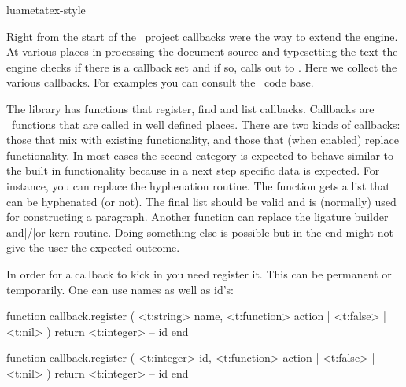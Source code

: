 

\environment luametatex-style

\startdocument[title=Callbacks]

\startsubject[title=Contents]
    \setups[sectioncontents]
\stopsubject

\startsection[title={Introduction}]

Right from the start of the \LUATEX\ project callbacks were the way to extend the
engine. At various places in processing the document source and typesetting the
text the engine checks if there is a callback set and if so, calls out to \LUA.
Here we collect the various callbacks. For examples you can consult the \CONTEXT\
code base.

The  library has functions that register, find and list
callbacks. Callbacks are \LUA\ functions that are called in well defined places.
There are two kinds of callbacks: those that mix with existing functionality, and
those that (when enabled) replace functionality. In most cases the second
category is expected to behave similar to the built in functionality because in a
next step specific data is expected. For instance, you can replace the
hyphenation routine. The function gets a list that can be hyphenated (or not).
The final list should be valid and is (normally) used for constructing a
paragraph. Another function can replace the ligature builder and|/|or kern
routine. Doing something else is possible but in the end might not give the user
the expected outcome.

In order for a callback to kick in you need register it. This can be permanent or
temporarily. One can use names as well as id's:

\starttyping[option=LUA]
function callback.register (
    <t:string>   name,
    <t:function> action | <t:false> | <t:nil>
)
    return <t:integer> -- id
end

function callback.register (
    <t:integer>  id,
    <t:function> action | <t:false> | <t:nil>
)
    return <t:integer> -- id
end
\stoptyping

